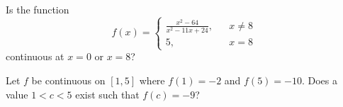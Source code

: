 \documentclass{ximera}
\begin{document}
\begin{exercise}
  


Is the function
\[
f(x)=\left\{\begin{array}{ccc} 
\frac{x^2-64}{x^2-11 x+24},		& & x\ne8\\
5, & & x=8
\end{array}\right.
\]
continuous at $x=0$ or $x=8$?

\begin{prompt}
\begin{multipleChoice}
\end{multipleChoice}
\end{prompt}

\end{exercise}

\begin{exercise}



Let $f$ be continuous on $\left[1,5\right]$ where $f(1)=-2$ and $f(5)=-10$. Does a value $1<c<5$ exist such that $f(c)=-9$?

\begin{multipleChoice}
\end{multipleChoice}

\end{exercise}
\end{document}
